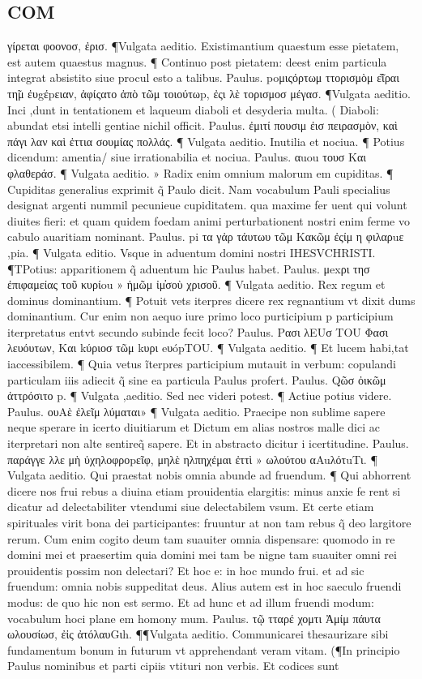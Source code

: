 \documentclass{article}
\begin{document}
\begin{pages}
\section*{COM }
\marginpar{[ p.6 ]}\pstart  γίρεται φοονοσ, ἐρισ. ¶Vulgata aeditio. Existimantium quaestum esse pietatem, est autem quaestus magnus. ¶ Continuo post pietatem: deest enim particula integrat absistito siue procul esto a talibus. Paulus. poμιςόρτωμ ττορισμὸμ ε̃͂ιραι τη̃μ ἐυgέpειαν, ἀφίςατο ἀπὸ τῶμ τοιούτωp, ἐςι λὲ τορισμοσ μέγασ. ¶Vulgata aeditio. Inci ,dunt in tentationem et laqueum diaboli et desyderia multa. ( Diaboli: abundat etsi intelli gentiae nichil officit. Paulus. ἐμιτί πουσιμ ἐισ πειρασμὸν, καὶ πάγι λαν καὶ ἐττια σουμίας πολλάς. ¶ Vulgata aeditio. Inutilia et nociua. ¶ Potius dicendum: amentia/  siue irrationabilia et nociua. Paulus. αuou τουσ Και φλαθεράσ. ¶ Vulgata aeditio. » Radix enim omnium malorum em cupiditas. ¶ Cupiditas generalius exprimit q̃ Paulo dicit. Nam vocabulum Pauli specialius designat argenti nummil pecunieue cupiditatem. qua maxime fer uent qui volunt diuites fieri: et quam quidem foedam animi perturbationent nostri enim ferme vo cabulo auaritiam nominant. Paulus. pi τα γἀρ τάυτωυ τῶμ Κακῶμ ἐςίμ η φιλαρuε ,pia. ¶ Vulgata editio. Vsque in aduentum domini nostri IHESVCHRISTI. ¶TPotius: apparitionem q̃ aduentum hic Paulus habet. Paulus. μexρι τησ ἐπιφαμείας τοῦ κυρίou » ἡμῶμ ἰμ̓σοὺ χρισοῦ. ¶ Vulgata aeditio. Rex regum et dominus dominantium. ¶ Potuit vets iterpres dicere rex regnantium vt dixit dums dominantium. Cur enim non aequo iure primo loco purticipium p participium iterpretatus entvt secundo subinde fecit loco? Paulus. Pασι λEUσ TOU  Φασι λευόυτων, Και kύριοσ τῶμ kυρι eυópTOU. ¶ Vulgata aeditio. ¶ Et lucem habi,tat iaccessibilem. ¶ Quia vetus ĩterpres participium mutauit in verbum: copulandi particulam iiis adiecit q̃ sine ea particula Paulus profert. Paulus. Qῶσ ὀικῶμ ἀττρόσιτο p. ¶ Vulgata ,aeditio. Sed nec videri potest. ¶ Actiue potius videre. Paulus. ουAὲ ἐλεῖμ λύμαται» ¶ Vulgata aeditio. Praecipe non sublime sapere neque sperare in icerto diuitiarum et Dictum em alias nostros malle dici ac iterpretari non alte sentireq̃ sapere. Et in abstracto dicitur i icertitudine. Paulus. παράγγε λλε μὴ ὐχηλοφροpεῖφ, μηλὲ ηλπηχέμαι ἐττὶ » ωλούτου αAuλότuTι. ¶ Vulgata aeditio. Qui praestat nobis omnia abunde ad fruendum. ¶ Qui abhorrent dicere nos frui rebus a diuina etiam prouidentia elargitis: minus anxie fe rent si dicatur ad delectabiliter vtendumi siue delectabilem vsum. Et certe etiam spirituales virit bona dei participantes: fruuntur at non tam rebus q̃ deo largitore rerum. Cum enim cogito deum tam suauiter omnia dispensare: quomodo in re domini mei et praesertim quia domini mei tam be nigne tam suauiter omni rei prouidentis possim non delectari? Et hoc e: in hoc mundo frui. et ad sic fruendum: omnia nobis suppeditat deus. Alius autem est in hoc saeculo fruendi modus: de quo hic non est sermo. Et ad hunc et ad illum fruendi modum: vocabulum hoci plane em homony mum. Paulus. τῷ τταρέ χομτι Ἀμίμ πάυτα ωλουσίωσ, ἐἰς ἀτόλαυGιh. ¶¶Vulgata aeditio. Communicarei thesaurizare sibi fundamentum bonum in futurum vt apprehendant veram vitam. (¶In principio Paulus nominibus et parti cipiis vtituri non verbis. Et codices sunt 
\end{pages}
\end{document}

